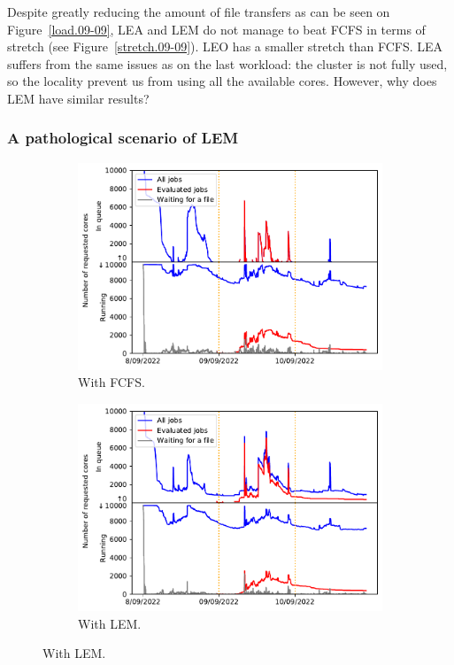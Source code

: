 \documentclass[conference,10pt]{IEEEtran}
\begin{document}
Despite greatly reducing the amount of file transfers as can be seen on Figure~\ref{load.09-09}, LEA and LEM
do not manage to beat FCFS in terms of stretch (see Figure~\ref{stretch.09-09}). 
LEO has a smaller stretch than FCFS. 
LEA suffers from the same issues as on the last workload: the cluster is not fully used, so 
the locality prevent us from using all the available cores.
However, why does LEM have similar results?

\subsubsection{A pathological scenario of LEM}

\begin{figure}[tb]
\begin{subfigure}[b]{0.49\linewidth}\centering\includegraphics[width=1\linewidth]{../MBSS/plot/Cluster_usage/2022-09-09->2022-09-09_V10000_Fcfs_Used_nodes_Reduced_450_128_32_256_4_1024_core_by_core.pdf}\caption{With FCFS.}\label{cluster_09-09_fcfs}\end{subfigure}
\begin{subfigure}[b]{0.49\linewidth}\centering\includegraphics[width=1\linewidth]{../MBSS/plot/Cluster_usage/2022-09-09->2022-09-09_V10000_Fcfs_with_a_score_mixed_strategy_x500_x1_x0_x0_Used_nodes_Reduced_450_128_32_256_4_1024_core_by_core.pdf}\caption{With LEM.}\label{cluster_09-09_lem}

\end{subfigure}
\end{figure}
\end{document}
